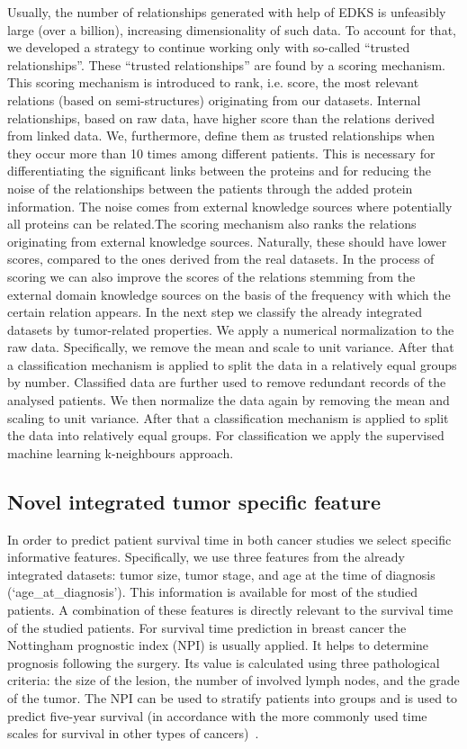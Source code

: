 \documentclass{bmcart}
\begin{document}
Usually, the number of relationships generated with help of EDKS is
unfeasibly large (over a billion), increasing dimensionality of such
data. To account for that,  we developed a strategy to continue working
only with so-called {\textquotedblleft}trusted
relationships{\textquotedblright}. These {\textquotedblleft}trusted
relationships{\textquotedblright} are found by a scoring mechanism.
This scoring mechanism is introduced to rank, i.e. score, the most
relevant relations (based on semi-structures) originating from our
datasets. Internal relationships, based on raw data, have higher score than the relations derived from linked data. We, furthermore, define them as trusted relationships when they occur more than 10 times among different patients. This is necessary for differentiating the significant links between the proteins and for reducing the noise of the relationships between the patients through the added protein information. The noise comes from external knowledge sources where potentially all proteins can be related.The scoring mechanism also ranks the relations originating from external knowledge sources. Naturally, these should have lower scores, compared to the ones derived from the real datasets. In the process of scoring we can also improve the scores of the relations stemming from the external domain knowledge sources on the basis of the frequency with which  the certain relation appears. In the next step we classify the already integrated datasets by tumor-related properties.
We apply a numerical normalization to the raw data. Specifically, we remove the mean and scale to unit variance. After that a classification mechanism is applied to split the data in a relatively equal groups by number. Classified data are further used to
remove redundant records of the analysed patients. We then normalize the data again by removing the mean and scaling to unit variance. After that a classification mechanism is applied to split the data into relatively equal groups. For classification
we apply the supervised machine learning k-neighbours approach.  

\subsection{Novel integrated tumor specific feature}

In order to predict patient survival time in both cancer studies we
select specific informative features. Specifically, we use three
features from the already integrated datasets: tumor size, tumor stage,
and age at the time of diagnosis
({\textquoteleft}age\_at\_diagnosis{\textquoteright}). This information
is available for most of the studied patients. A combination of these
features is directly relevant to the survival time of the studied
patients. For survival time prediction in breast cancer the Nottingham
prognostic index (NPI) is usually applied. It helps to determine
prognosis following the surgery. Its value is calculated using three
pathological criteria: the size of the lesion, the number of involved
lymph nodes, and the grade of the tumor. The NPI can be used to
stratify patients into groups and is used to predict five-year survival
(in accordance with the more commonly used time scales for survival in
other types of cancers)~\cite{15}.
\end{document}
